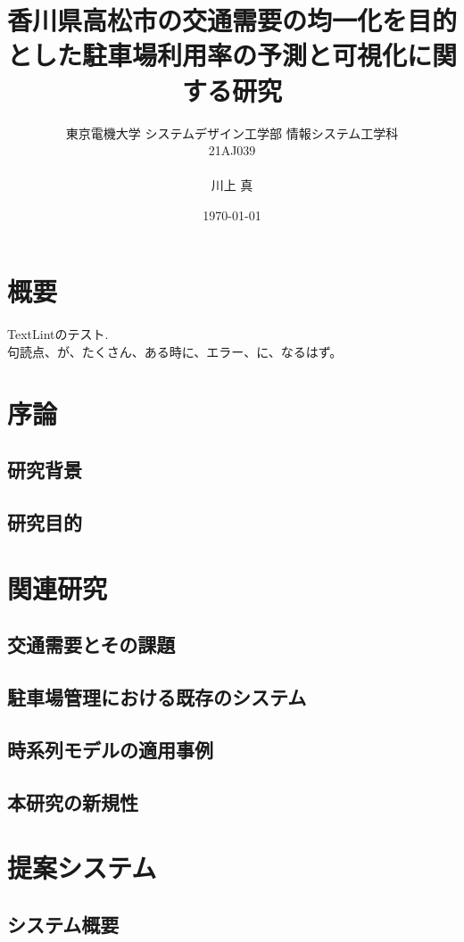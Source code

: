 \documentclass[uplatex,a4j,10pt,titlepage]{jsarticle}
\title {
	香川県高松市の交通需要の均一化を目的とした駐車場利用率の予測と可視化に関する研究
}
\author {
	東京電機大学 システムデザイン工学部  情報システム工学科\\
	21AJ039 \\
	\\
	川上 真
}
\date{\today}
\begin{document}
\maketitle

\tableofcontents

\section*{概要}
TextLintのテスト.\\
句読点、が、たくさん、ある時に、エラー、に、なるはず。



\section{序論}
\subsection{研究背景}
\subsection{研究目的}

\section{関連研究}
\subsection{交通需要とその課題}
\subsection{駐車場管理における既存のシステム}
\subsection{時系列モデルの適用事例}
\subsection{本研究の新規性}

\section{提案システム}
\subsection{システム概要}
\end{document}
